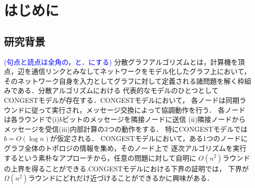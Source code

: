 \documentclass[12pt]{thesis}
\newcommand{\Izumi}[1]{\textcolor{blue}{(#1)}}
\newcommand{\CONGEST}{\textsf{CONGEST}}
\theoremstyle{definition}
\begin{document}
\baselineskip=22pt
\pagestyle{empty}

\maketitle

\pagestyle{myheadings}	%
\tableofcontents

\newpage


\chapter{はじめに}

\section{研究背景}
\Izumi{句点と読点は全角の，と．にする}
分散グラフアルゴリズムとは，計算機を頂点，辺を通信リンクとみなしてネットワークをモデル化したグラフ上において，
そのネットワーク自身を入力としてグラフに対して定義される諸問題を解く枠組みである．分散アルゴリズムにおける
代表的なモデルのひとつとして{{\CONGEST}}モデルが存在する．{\CONGEST}モデルにおいて，
各ノードは同期ラウンドに従って実行され，メッセージ交換によって協調動作を行う．
各ノードは各ラウンドで(i)$b$ビットのメッセージを隣接ノードに送信
(ii)隣接ノードからメッセージを受信(iii)内部計算の3つの動作をする．
特に{\CONGEST}モデルでは$b = O(\log n)$が仮定される．
{\CONGEST}モデルにおいて，ある1つのノードにグラフ全体のトポロジの情報を集め，そのノード上で
逐次アルゴリズムを実行するという素朴なアプローチから，任意の問題に対して自明に
$O (n^{2})$ラウンドの上界を得ることができる.{\CONGEST}モデルにおける下界の証明では，
下界が$\Omega(n^{2})$ラウンドにどれだけ近づけることができるかに興味がある．
\end{document}

